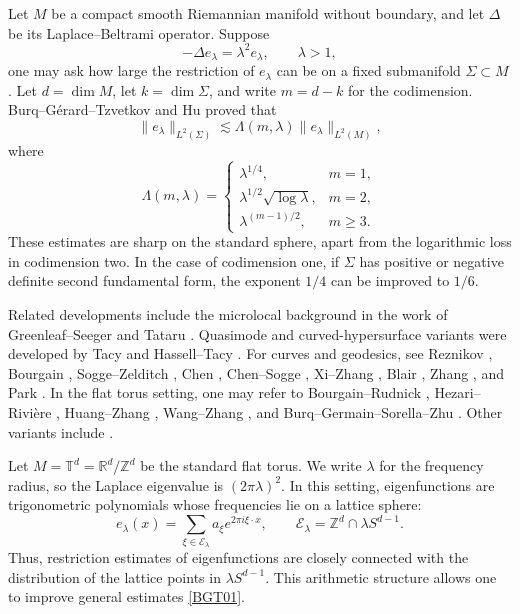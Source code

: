 \documentclass[11pt,reqno]{amsart}
\numberwithin{equation}{section}
\newcommand{\1}{\textbf{1}}
\newcommand{\la}{\lambda}
\begin{document}
	Let \(M\) be a compact smooth Riemannian manifold without boundary, and let
	\(\Delta\) be its Laplace--Beltrami operator. Suppose
	\[
	-\Delta e_\lambda=\lambda^2 e_\lambda,\qquad \lambda>1,
	\]
	one may ask how large the restriction of \(e_\lambda\) can be on a fixed
	submanifold \(\Sigma\subset M\).  Let \(d=\dim M\), let \(k=\dim\Sigma\), and
	write \(m=d-k\) for the codimension.  Burq--G\'erard--Tzvetkov
	\cite{BGT2006} and Hu \cite{Hu2009} proved that
	\begin{equation}\label{BGT01}
		\|e_\lambda\|_{L^2(\Sigma)}
		\lesssim
		\Lambda(m,\lambda)\|e_\lambda\|_{L^2(M)},
	\end{equation}
	where
	\[
	\Lambda(m,\lambda)=
	\begin{cases}
		\lambda^{1/4}, & m=1,\\
		\lambda^{1/2}\sqrt{\log\lambda}, & m=2,\\
		\lambda^{(m-1)/2}, & m\ge3.
	\end{cases}
	\]
	These estimates are sharp on the standard sphere, apart from the logarithmic
	loss in codimension two.  In the case of codimension one, if \(\Sigma\) has positive or
	negative definite second fundamental form, the exponent \(1/4\) can be
	improved to \(1/6\).  
	
	Related developments include the microlocal background in the work of Greenleaf--Seeger \cite{gs1994} and Tataru \cite{tata}. Quasimode and
	curved-hypersurface variants were developed by Tacy \cite{tacy} and
	Hassell--Tacy \cite{HT12}. For curves and geodesics, see Reznikov
	\cite{Rez2004}, Bourgain \cite{bo2009}, Sogge--Zelditch \cite{sz2014},
	Chen \cite{chen}, Chen--Sogge \cite{chensogge}, Xi--Zhang \cite{xz},
	Blair \cite{mb}, Zhang \cite{zhang}, and Park \cite{park}.  In the flat
	torus setting, one may refer to Bourgain--Rudnick \cite{BR2011}, Hezari--Rivi\`ere \cite{hr},
	Huang--Zhang \cite{hzapde}, Wang--Zhang \cite{wzadv}, and
	Burq--Germain--Sorella--Zhu \cite{BGSZ}. Other variants include \cite{hez,hr,BP,hwz,yzhang}.
	
	Let $M=\mathbb{T}^d=\mathbb{R}^d/\mathbb{Z}^d$ be the standard flat torus. We write $\lambda$ for the frequency radius, so the Laplace eigenvalue is $(2\pi\lambda)^2$. In this setting, eigenfunctions are
	trigonometric polynomials whose frequencies lie on a lattice sphere:
	\[
	e_\lambda(x)=\sum_{\xi\in \mathcal E_\lambda}a_\xi e^{2\pi i\xi\cdot x},
	\qquad
	\mathcal E_\lambda=\mathbb Z^d\cap \lambda S^{d-1}.
	\]
	Thus, restriction estimates of eigenfunctions are closely connected with the distribution of the lattice points in $\la S^{d-1}$.
	This arithmetic structure allows one to improve general estimates
	\eqref{BGT01}.
	
\end{document}
